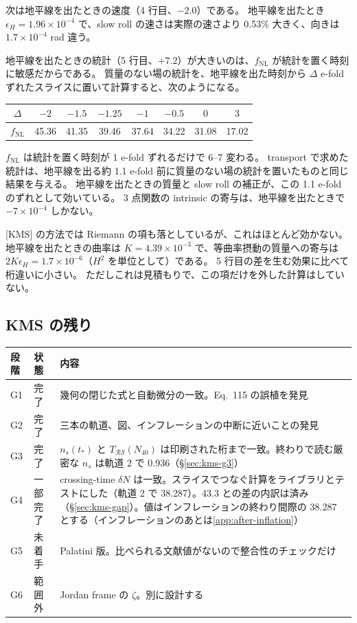 \documentclass[a4paper,11pt]{ltjsarticle}
\newcommand{\fnl}{f_{\mathrm{NL}}}
\begin{document}
次は地平線を出たときの速度（4 行目、$-2.0$）である。
地平線を出たとき $\epsilon_H=1.96\times10^{-4}$ で、slow roll の速さは実際の速さより 0.53\% 大きく、向きは $1.7\times10^{-4}$ rad 違う。

地平線を出たときの統計（5 行目、$+7.2$）が大きいのは、$\fnl$ が統計を置く時刻に敏感だからである。
質量のない場の統計を、地平線を出た時刻から $\Delta$ e-fold ずれたスライスに置いて計算すると、次のようになる。
\begin{center}
\begin{tabular}{cccccccc}
\toprule
$\Delta$ & $-2$ & $-1.5$ & $-1.25$ & $-1$ & $-0.5$ & $0$ & $3$ \\
\midrule
$\fnl$ & 45.36 & 41.35 & 39.46 & 37.64 & 34.22 & 31.08 & 17.02 \\
\bottomrule
\end{tabular}
\end{center}
$\fnl$ は統計を置く時刻が 1 e-fold ずれるだけで 6--7 変わる。
transport で求めた統計は、地平線を出る約 1.1 e-fold 前に質量のない場の統計を置いたものと同じ結果を与える。
地平線を出たときの質量と slow roll の補正が、この 1.1 e-fold のずれとして効いている。
3 点関数の intrinsic の寄与は、地平線を出たときで $-7\times10^{-4}$ しかない。

[KMS] の方法では Riemann の項も落としているが、これはほとんど効かない。
地平線を出たときの曲率は $K=4.39\times10^{-3}$ で、等曲率摂動の質量への寄与は $2K\epsilon_H=1.7\times10^{-6}$（$H^2$ を単位として）である。
5 行目の差を生む効果に比べて桁違いに小さい。
ただしこれは見積もりで、この項だけを外した計算はしていない。

\subsection{KMS の残り}

\begin{center}
\begin{tabular}{llp{10.5cm}}
\toprule
段階 & 状態 & 内容 \\
\midrule
G1 & 完了 & 幾何の閉じた式と自動微分の一致。Eq.~115 の誤植を発見 \\
G2 & 完了 & 三本の軌道、図、インフレーションの中断に近いことの発見 \\
G3 & 完了 & $n_s(t_*)$ と $T_{\mathcal{RS}}(N_{40})$ は印刷された桁まで一致。終わりで読む厳密な $n_s$ は軌道 2 で 0.936（\S\ref{sec:kms-g3}） \\
G4 & 一部完了 & crossing-time $\delta N$ は一致。スライスでつなぐ計算をライブラリとテストにした（軌道 2 で 38.287）。43.3 との差の内訳は済み（\S\ref{sec:kms-gap}）。値はインフレーションの終わり間際の 38.287 とする（インフレーションのあとは\ref{app:after-inflation}） \\
G5 & 未着手 & Palatini 版。比べられる文献値がないので整合性のチェックだけ \\
G6 & 範囲外 & Jordan frame の $\zeta$。別に設計する \\
\bottomrule
\end{tabular}
\end{center}
\end{document}
